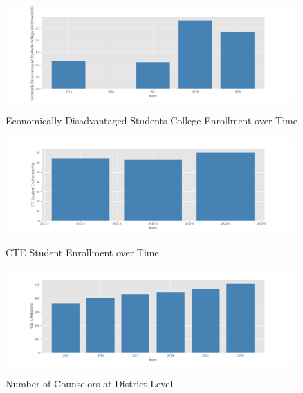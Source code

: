 \documentclass[10pt]{beamer}
\begin{document}
\begin{frame}{}
    \begin{figure}
        \caption{Economically Disadvantaged Students College Enrollment over Time}
        \includegraphics[width=11cm]{EDS Students College Enrollment.png}
        \label{fig4}
    \end{figure}
\end{frame}


\begin{frame}{}
    \begin{figure}
        \caption{CTE Student Enrollment over Time}
        \includegraphics[width=11cm]{CTE Student Enrollment.png}
        \label{fig3}
    \end{figure}
\end{frame}

\begin{frame}{}
    \begin{figure}
        \caption{Number of Counselors at District Level}
        \includegraphics[width=11cm]{Total Counselors.png}
        \label{fig5}
    \end{figure}
\end{frame}
\end{document}
